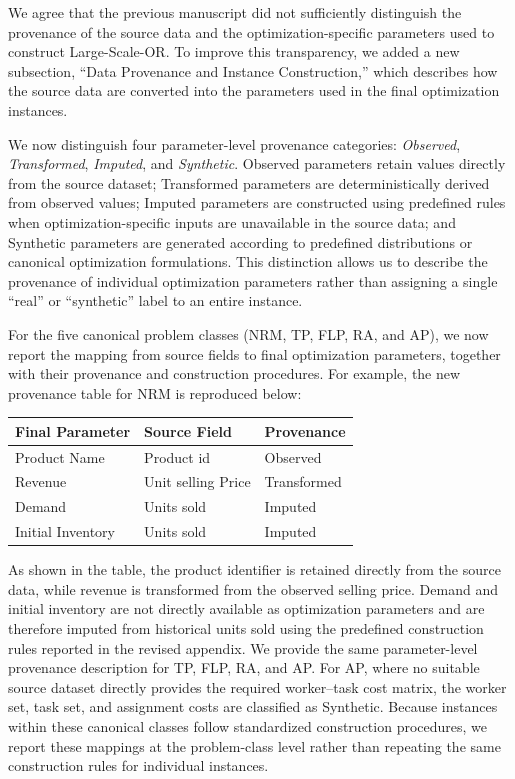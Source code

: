 \documentclass[11pt]{article}
\begin{document}
\begin{enumerate}[label=(R1.Major.\arabic*),leftmargin=*]
We agree that the previous manuscript did not sufficiently distinguish the
provenance of the source data and the optimization-specific parameters used
to construct Large-Scale-OR. To improve this transparency, we added a new
subsection, ``Data Provenance and Instance Construction,'' which describes
how the source data are converted into the parameters used in the final
optimization instances.

We now distinguish four parameter-level provenance categories:
\textit{Observed}, \textit{Transformed}, \textit{Imputed}, and
\textit{Synthetic}. Observed parameters retain values directly from the
source dataset; Transformed parameters are deterministically derived from
observed values; Imputed parameters are constructed using predefined rules
when optimization-specific inputs are unavailable in the source data; and
Synthetic parameters are generated according to predefined distributions or
canonical optimization formulations. This distinction allows us to describe
the provenance of individual optimization parameters rather than assigning a
single ``real'' or ``synthetic'' label to an entire instance.

For the five canonical problem classes (NRM, TP, FLP, RA, and AP), we now
report the mapping from source fields to final optimization parameters,
together with their provenance and construction procedures. For example, the
new provenance table for NRM is reproduced below:

\begin{center}
\small
\setlength{\tabcolsep}{6pt}
\renewcommand{\arraystretch}{1.12}
\begin{tabular}{lll}
\hline
\textbf{Final Parameter}
& \textbf{Source Field}
& \textbf{Provenance} \\
\hline
Product Name
& Product id
& Observed \\

Revenue
& Unit selling Price
& Transformed \\

Demand
& Units sold
& Imputed \\

Initial Inventory
& Units sold
& Imputed \\
\hline
\end{tabular}
\end{center}

As shown in the table, the product identifier is retained directly from the
source data, while revenue is transformed from the observed selling price.
Demand and initial inventory are not directly available as optimization
parameters and are therefore imputed from historical units sold using the
predefined construction rules reported in the revised appendix. We provide
the same parameter-level provenance description for TP, FLP, RA, and AP.
For AP, where no suitable source dataset directly provides the required
worker--task cost matrix, the worker set, task set, and assignment costs are
classified as Synthetic. Because instances within these canonical classes
follow standardized construction procedures, we report these mappings at the
problem-class level rather than repeating the same construction rules for
individual instances.


\end{enumerate}
\end{document}
